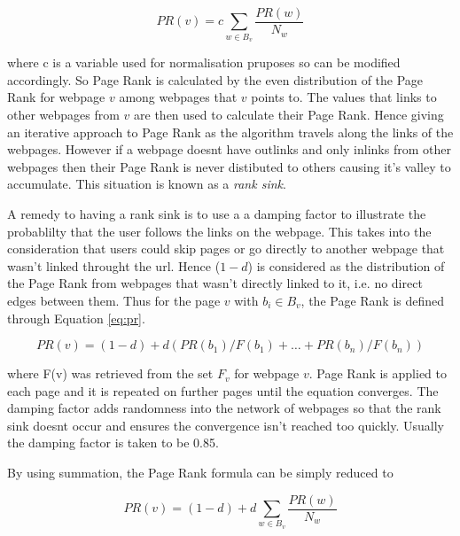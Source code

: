 \begin{equation}
PR(v) = c\sum_{w \in B_v}\frac{PR(w)}{N_w}
\end{equation}

where c is a variable used for normalisation pruposes so can be modified accordingly. So Page Rank is calculated by the even distribution of the Page Rank for webpage $v$ among webpages that $v$ points to. The values that links to other webpages from $v$ are then used to calculate their Page Rank. Hence giving an iterative approach to Page Rank as the algorithm travels along the links of the webpages. However if a webpage doesnt have outlinks and only inlinks from other webpages then their Page Rank is never distibuted to others causing it's valley to accumulate. This situation is known as a \emph{rank sink}.

A remedy to having a rank sink is to use a a damping factor to illustrate the probablilty that the user follows the links on the webpage. This takes into the consideration that users could skip pages or go directly to another webpage that wasn't linked throught the url. Hence ($1-d$) is considered as the distribution of the Page Rank from webpages that wasn't directly linked to it, i.e. no direct edges between them. Thus for the page $v$ with $b_i \in B_v$, the Page Rank\cite{brin1998anatomy} is defined through Equation \ref{eq:pr}.

\begin{equation} \label{eq:pr}
PR(v) = (1-d) + d (PR(b_1)/F(b_1) + … + PR(b_n)/F(b_n))
\end{equation}

where F(v) was retrieved from the set $F_v$ for webpage $v$. Page Rank is applied to each page and it is repeated on further pages until the equation converges. The damping factor adds randomness into the network of webpages so that the rank sink doesnt occur and ensures the convergence isn't reached too quickly. Usually the damping factor is taken to be 0.85. 

By using summation, the Page Rank formula can be simply reduced to

\begin{equation}
PR(v) = (1 - d) + d\sum_{w \in B_v}\frac{PR(w)}{N_w}
\end{equation}

